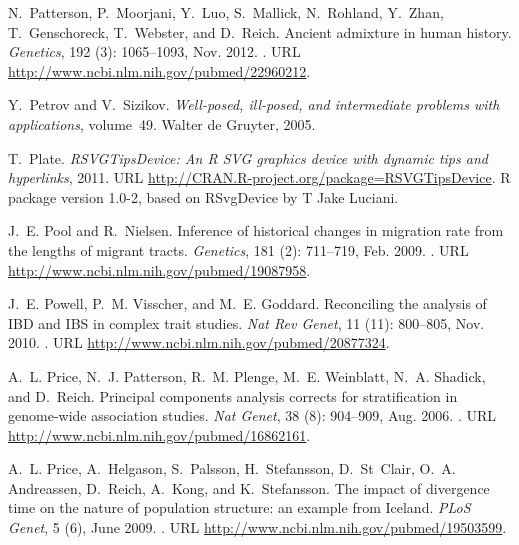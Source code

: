 \documentclass{article}
\begin{document}
\begin{thebibliography}{76}
N.~Patterson, P.~Moorjani, Y.~Luo, S.~Mallick, N.~Rohland, Y.~Zhan,
  T.~Genschoreck, T.~Webster, and D.~Reich.
\newblock Ancient admixture in human history.
\newblock \emph{Genetics}, 192 (3): 1065--1093, Nov. 2012.
\newblock {}.
\newblock URL \url{http://www.ncbi.nlm.nih.gov/pubmed/22960212}.

Y.~Petrov and V.~Sizikov.
\newblock \emph{Well-posed, ill-posed, and intermediate problems with
  applications}, volume~49.
\newblock Walter de Gruyter, 2005.

T.~Plate.
\newblock \emph{RSVGTipsDevice: An R SVG graphics device with dynamic tips and
  hyperlinks}, 2011.
\newblock URL \url{http://CRAN.R-project.org/package=RSVGTipsDevice}.
\newblock R package version 1.0-2, based on RSvgDevice by T Jake Luciani.

J.~E. Pool and R.~Nielsen.
\newblock Inference of historical changes in migration rate from the lengths of
  migrant tracts.
\newblock \emph{Genetics}, 181 (2): 711--719, Feb. 2009.
\newblock {}.
\newblock URL \url{http://www.ncbi.nlm.nih.gov/pubmed/19087958}.

J.~E. Powell, P.~M. Visscher, and M.~E. Goddard.
\newblock Reconciling the analysis of {IBD} and {IBS} in complex trait studies.
\newblock \emph{Nat Rev Genet}, 11 (11): 800--805, Nov. 2010.
\newblock {}.
\newblock URL \url{http://www.ncbi.nlm.nih.gov/pubmed/20877324}.

A.~L. Price, N.~J. Patterson, R.~M. Plenge, M.~E. Weinblatt, N.~A. Shadick, and
  D.~Reich.
\newblock Principal components analysis corrects for stratification in
  genome-wide association studies.
\newblock \emph{Nat Genet}, 38 (8): 904--909, Aug. 2006.
\newblock {}.
\newblock URL \url{http://www.ncbi.nlm.nih.gov/pubmed/16862161}.

A.~L. Price, A.~Helgason, S.~Palsson, H.~Stefansson, D.~St~Clair, O.~A.
  Andreassen, D.~Reich, A.~Kong, and K.~Stefansson.
\newblock The impact of divergence time on the nature of population structure:
  an example from {Iceland}.
\newblock \emph{PLoS Genet}, 5 (6), June 2009.
\newblock {}.
\newblock URL \url{http://www.ncbi.nlm.nih.gov/pubmed/19503599}.


\end{thebibliography}
\end{document}
